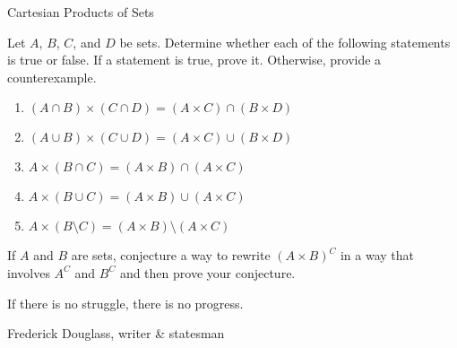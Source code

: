 \begin{section}{Cartesian Products of Sets}
\begin{problem}
Let $A$, $B$, $C$, and $D$ be sets.  Determine whether each of the following statements is true or false.  If a statement is true, prove it.  Otherwise, provide a counterexample.
\begin{enumerate}[label=\textrm{(\alph*)}]
\item $(A\cap B)\times (C\cap D)=(A\times C)\cap (B\times D)$
\item $(A\cup B)\times (C\cup D)=(A\times C)\cup (B\times D)$
\item $A\times (B\cap C)=(A\times B)\cap (A\times C)$
\item $A\times (B\cup C)=(A\times B)\cup (A\times C)$
\item $A\times (B\setminus C) = (A\times B)\setminus (A\times C)$
\end{enumerate}
\end{problem}

\begin{problem}
If $A$ and $B$ are sets, conjecture a way to rewrite $(A\times B)^C$ in a way that involves $A^C$ and $B^C$ and then prove your conjecture.
\end{problem}

\epigraph{If there is no struggle, there is no progress.}{Frederick Douglass, writer \& statesman}

\end{section}